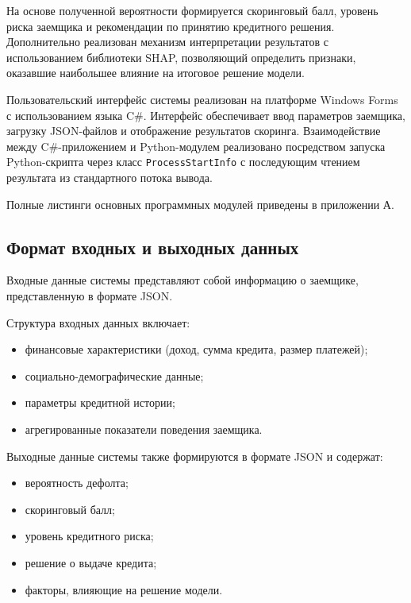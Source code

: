 На основе полученной вероятности формируется скоринговый балл, уровень риска заемщика и рекомендации по принятию кредитного решения. Дополнительно реализован механизм интерпретации результатов с использованием библиотеки SHAP, позволяющий определить признаки, оказавшие наибольшее влияние на итоговое решение модели.

Пользовательский интерфейс системы реализован на платформе Windows Forms с использованием языка C\#. Интерфейс обеспечивает ввод параметров заемщика, загрузку JSON-файлов и отображение результатов скоринга. Взаимодействие между C\#-приложением и Python-модулем реализовано посредством запуска Python-скрипта через класс \texttt{ProcessStartInfo} с последующим чтением результата из стандартного потока вывода.

Полные листинги основных программных модулей приведены в приложении А.

\subsection{Формат входных и выходных данных}

Входные данные системы представляют собой информацию о заемщике, представленную в формате JSON.

Структура входных данных включает:

\begin{itemize}
  \item финансовые характеристики (доход, сумма кредита, размер платежей);
  \item социально-демографические данные;
  \item параметры кредитной истории;
  \item агрегированные показатели поведения заемщика.
\end{itemize}

Выходные данные системы также формируются в формате JSON и содержат:

\begin{itemize}
  \item вероятность дефолта;
  \item скоринговый балл;
  \item уровень кредитного риска;
  \item решение о выдаче кредита;
  \item факторы, влияющие на решение модели.
\end{itemize}


